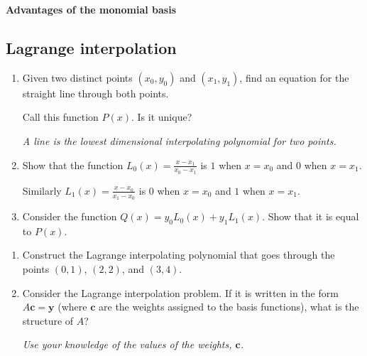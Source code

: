 \documentclass[12pt,letterpaper,noanswers]{exam}
\newcommand{\vc}[1]{\boldsymbol{#1}}
\def\dsst{\displaystyle}
\begin{document}
\noindent\textbf{Advantages of the monomial basis}


\subsection*{Lagrange interpolation}

\begin{enumerate}[resume]

\item Given two distinct points $(x_0,y_0)$ and $(x_1,y_1)$, find an equation for the
straight line through both points. 

Call this function $P(x)$.  Is it unique?

\emph{A line is the lowest dimensional interpolating polynomial for two points.}

\vspace{1in}

\item Show that the function $\dsst{L_0(x) = \frac{x-x_1}{x_0-x_1}}$ is $1$
when $x=x_0$ and $0$ when $x=x_1$.  

Similarly $\dsst{L_1(x) = \frac{x-x_0}{x_1-x_0}}$
is $0$ when $x=x_0$ and $1$ when $x=x_1$.

\vspace{1in}

\item Consider the function $Q(x) = y_0L_0(x) + y_1L_1(x)$.  Show that it is
equal to $P(x)$.

\vspace{1in}

\end{enumerate}


\begin{enumerate}[resume]

\item Construct the Lagrange interpolating polynomial that goes through the points $(0,1)$, $(2,2)$, and $(3,4)$.  %

\vspace{1in}

\item Consider the Lagrange interpolation problem.  If it is written in the form $A\vc{c} = \vc{y}$ (where $\mathbf{c}$ are the weights assigned to the basis functions), what is the structure of $A$?

\emph{Use your knowledge of the values of the weights, $\vc{c}$.}
\vspace{0.5in}
\end{enumerate}
\end{document}
